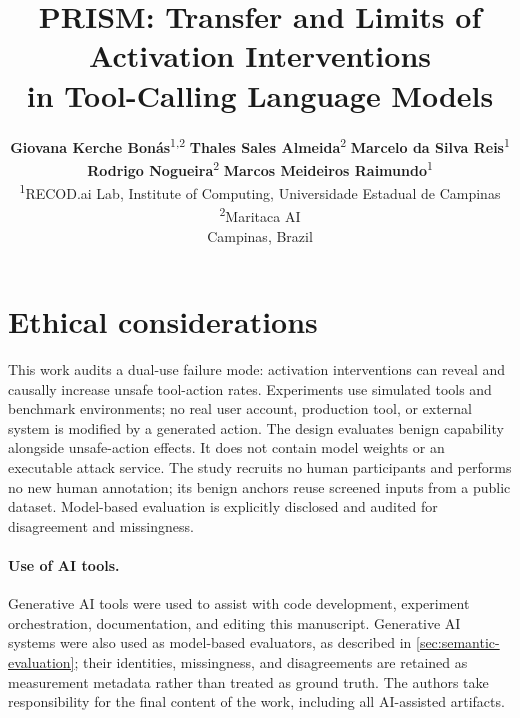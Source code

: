 \documentclass[11pt]{article}
\title{PRISM: Transfer and Limits of Activation Interventions\\
in Tool-Calling Language Models}
\author{
  \textbf{Giovana Kerche Bonás}\textsuperscript{1,2} \quad
  \textbf{Thales Sales Almeida}\textsuperscript{2} \quad
  \textbf{Marcelo da Silva Reis}\textsuperscript{1} \quad \\
  \textbf{Rodrigo Nogueira}\textsuperscript{2} \quad
  \textbf{Marcos Meideiros Raimundo}\textsuperscript{1}
  \\
  \textsuperscript{1}RECOD.ai Lab, Institute of Computing,
  Universidade Estadual de Campinas \\
  \textsuperscript{2}Maritaca AI \\
  Campinas, Brazil \\
}
\begin{document}
\maketitle







\FloatBarrier


\section*{Ethical considerations}
This work audits a dual-use failure mode: activation interventions can reveal and causally increase unsafe tool-action rates. Experiments use simulated tools and benchmark environments; no real user account, production tool, or external system is modified by a generated action. The design evaluates benign capability alongside unsafe-action effects.  It does not contain model weights or an executable attack service. The study recruits no human participants and performs no new human annotation; its benign anchors reuse screened inputs from a public dataset. Model-based evaluation is explicitly disclosed and audited for disagreement and missingness.

\paragraph{Use of AI tools.}
Generative AI tools were used to assist with code development, experiment
orchestration, documentation,  and editing this manuscript. Generative AI systems were also used as model-based evaluators, as described in \cref{sec:semantic-evaluation}; their identities, missingness, and disagreements are retained as measurement metadata rather than treated as ground truth. The authors take responsibility for the final content of the work, including all AI-assisted artifacts.



\clearpage
\appendix

\end{document}
